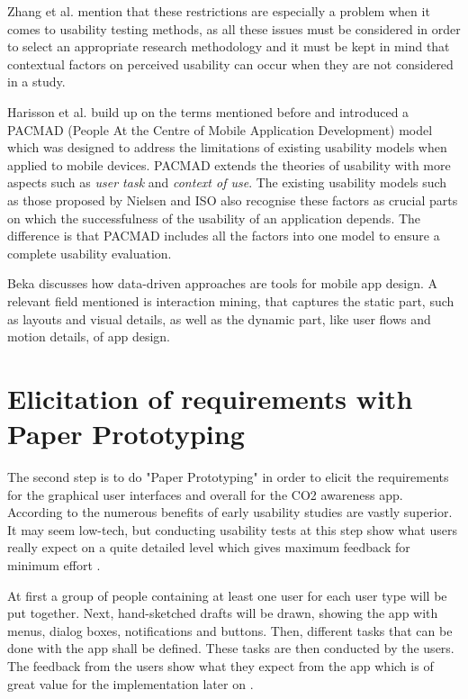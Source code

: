 Zhang et al. mention that these restrictions are especially a problem when it comes to usability testing methods, as all these issues must be considered in order to select an appropriate research methodology and it must be kept in mind that contextual factors on perceived usability can occur when they are not considered in a study.

Harisson et al. \cite{harrison2013usability} build up on the terms mentioned before and introduced a PACMAD (People At the Centre of Mobile Application Development) model which was designed to address the limitations of existing usability models when applied to mobile devices. PACMAD extends the theories of usability with more aspects such as \textit{user task} and \textit{context of use}. The existing usability models such as those proposed by Nielsen \cite{nielsen1994usability} and ISO \cite{bevan1998iso} also recognise these factors as crucial parts on which the successfulness of the usability of an application depends. The difference is that PACMAD includes all the factors into one model to ensure a complete usability evaluation.

Beka \cite{deka2016data} discusses how data-driven approaches are tools for mobile app design. A relevant field mentioned is interaction mining, that captures the static part, such as layouts and visual details, as well as the dynamic part, like user flows and motion details, of app design.

\section{Elicitation of requirements with Paper Prototyping}
The second step is to do "Paper Prototyping" in order to elicit the requirements for the graphical user interfaces and overall for the CO2 awareness app. According to \cite{lancaster2004paper} the numerous benefits of early usability studies are vastly superior. It may seem low-tech, but conducting usability tests at this step show what users really expect on a quite detailed level which gives maximum feedback for minimum effort \cite{weiss2003handheld}.

At first a group of people containing at least one user for each user type will be put together.  Next, hand-sketched drafts will be drawn, showing the app with menus, dialog boxes, notifications and buttons. Then, different tasks that can be done with the app shall be defined. These tasks are then conducted by the users. The feedback from the users show what they expect from the app which is of great value for the implementation later on \cite{snyder2003paper}.




